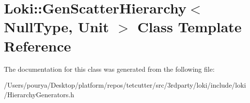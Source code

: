 \hypertarget{classLoki_1_1GenScatterHierarchy_3_01NullType_00_01Unit_01_4}{}\section{Loki\+:\+:Gen\+Scatter\+Hierarchy$<$ Null\+Type, Unit $>$ Class Template Reference}
\label{classLoki_1_1GenScatterHierarchy_3_01NullType_00_01Unit_01_4}


The documentation for this class was generated from the following file\+:\begin{DoxyCompactItemize}
\item 
/\+Users/pourya/\+Desktop/platform/repos/tetcutter/src/3rdparty/loki/include/loki/Hierarchy\+Generators.\+h\end{DoxyCompactItemize}
